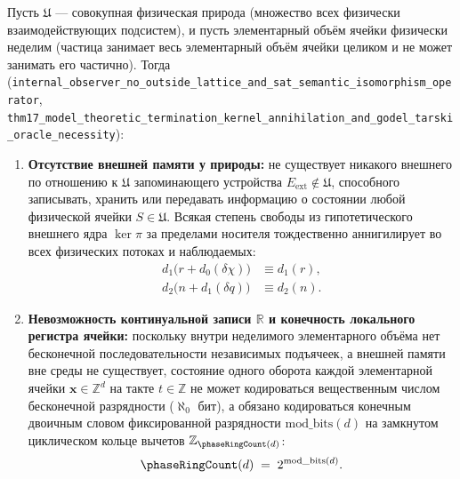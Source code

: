 \begin{theorem}
\label{thm:mono-no-external-memory}
Пусть $\mathfrak{U}$ --- совокупная физическая природа (множество всех физически взаимодействующих подсистем), и пусть элементарный объём ячейки физически неделим (частица занимает весь элементарный объём ячейки целиком и не может занимать его частично). Тогда (\texttt{internal\_\allowbreak observer\_\allowbreak no\_\allowbreak outside\_\allowbreak lattice\_\allowbreak and\_\allowbreak sat\_\allowbreak semantic\_\allowbreak isomorphism\_\allowbreak operator}, \texttt{thm17\_\allowbreak model\_\allowbreak theoretic\_\allowbreak termination\_\allowbreak kernel\_\allowbreak annihilation\_\allowbreak and\_\allowbreak godel\_\allowbreak tarski\_\allowbreak oracle\_\allowbreak necessity}):
\begin{enumerate}[label=\textbf{(\arabic*)},leftmargin=*]
\item \textbf{Отсутствие внешней памяти у природы:}
  не существует никакого внешнего по отношению к $\mathfrak{U}$ запоминающего устройства $E_{\mathrm{ext}} \notin \mathfrak{U}$, способного записывать, хранить или передавать информацию о состоянии любой физической ячейки $S \in \mathfrak{U}$. Всякая степень свободы из гипотетического внешнего ядра $\ker\pi$ за пределами носителя тождественно аннигилирует во всех физических потоках и наблюдаемых:
  \begin{align}
    d_1\bigl(r + d_0(\delta\chi)\bigr) &\equiv d_1(r), \label{eq:mono-no-ext-memory-kernel} \\
    d_2\bigl(n + d_1(\delta q)\bigr) &\equiv d_2(n). \label{eq:mono-no-ext-memory-kernel-d2}
  \end{align}
\item \textbf{Невозможность континуальной записи $\mathbb{R}$ и конечность локального регистра ячейки:}
  поскольку внутри неделимого элементарного объёма нет бесконечной последовательности независимых подъячеек, а внешней памяти вне среды не существует, состояние одного оборота каждой элементарной ячейки $\mathbf{x} \in \mathbb{Z}^d$ на такте $t \in \mathbb{Z}$ не может кодироваться вещественным числом бесконечной разрядности ($\aleph_0$ бит), а обязано кодироваться конечным двоичным словом фиксированной разрядности $\mathrm{mod\_bits}(d)$ на замкнутом циклическом кольце вычетов $\mathbb{Z}_{\phaseRingCount(d)}$:
  \begin{equation}
    \label{eq:mono-nring-power-two}
    \phaseRingCount(d) \;=\; 2^{\mathrm{mod\_bits}(d)}.

\end{equation}
\end{enumerate}
\end{theorem}
